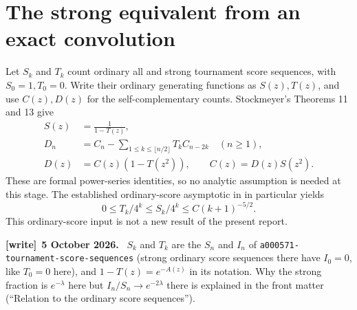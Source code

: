\documentclass[11pt,letterpaper]{article}
\newcommand{\file}[1]{\nolinkurl{#1}}
\theoremstyle{definition}\newtheorem{remark}[theorem]{Remark}
\newenvironment{writenote}[1][]{\par\smallskip\begingroup\small
 \noindent\textbf{[write]}\if\relax\detokenize{#1}\relax\else~\textbf{#1.}\fi\ }%
 {\par\endgroup\smallskip}
\begin{document}
\section{The strong equivalent from an exact convolution}\label{sct:sec:D}
Let $S_k$ and $T_k$ count ordinary all and strong tournament score sequences,
with $S_0=1,T_0=0$. Write their ordinary generating functions as $S(z),T(z)$,
and use $C(z),D(z)$ for the self-complementary counts. Stockmeyer's
Theorems 11 and 13 \cite{stockmeyer} give
\begin{align}
 S(z)&=\frac1{1-T(z)},\label{sct:eq:ordinary-gf}\\
 D_n&=C_n-\sum_{1\le k\le\lfloor n/2\rfloor}T_k C_{n-2k}\quad(n\ge1),
 \label{sct:eq:Stock-conv}\\
 D(z)&=C(z)(1-T(z^2)),\qquad C(z)=D(z)S(z^2).
 \label{sct:eq:SC-gf}
\end{align}
These are formal power-series identities, so no analytic assumption is needed
at this stage. The established ordinary-score asymptotic in \cite{kolesnik}
in particular yields
\begin{equation}\label{sct:eq:ordinary-tail}
 0\le T_k/4^k\le S_k/4^k\le C(k+1)^{-5/2}.
\end{equation}
This ordinary-score input is not a new result of the present report.
\begin{writenote}[5 October 2026]
$S_k$ and $T_k$ are the $S_n$ and $I_n$ of \file{a000571-tournament-score-sequences} (strong ordinary score sequences there have $I_0=0$, like $T_0=0$ here), and $1-T(z)=e^{-A(z)}$ in its notation. Why the strong fraction is $e^{-\lambda}$ here but $I_n/S_n\to e^{-2\lambda}$ there is explained in the front matter (``Relation to the ordinary score sequences'').
\end{writenote}
\end{document}
